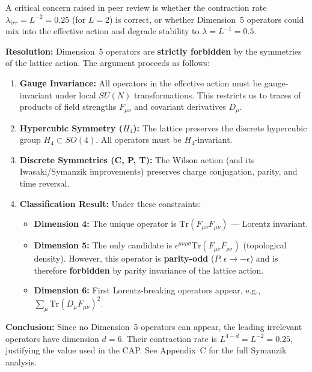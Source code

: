A critical concern raised in peer review is whether the contraction rate $\lambda_{irr} = L^{-2} = 0.25$ (for $L=2$) is correct, or whether Dimension~5 operators could mix into the effective action and degrade stability to $\lambda = L^{-1} = 0.5$.

\textbf{Resolution:} Dimension~5 operators are \textbf{strictly forbidden} by the symmetries of the lattice action. The argument proceeds as follows:

\begin{enumerate}
    \item \textbf{Gauge Invariance:} All operators in the effective action must be gauge-invariant under local $SU(N)$ transformations. This restricts us to traces of products of field strengths $F_{\mu\nu}$ and covariant derivatives $D_\mu$.
    
    \item \textbf{Hypercubic Symmetry ($H_4$):} The lattice preserves the discrete hypercubic group $H_4 \subset SO(4)$. All operators must be $H_4$-invariant.
    
    \item \textbf{Discrete Symmetries (C, P, T):} The Wilson action (and its Iwasaki/Symanzik improvements) preserves charge conjugation, parity, and time reversal.
    
    \item \textbf{Classification Result:} Under these constraints:
    \begin{itemize}
        \item \textbf{Dimension 4:} The unique operator is $\text{Tr}(F_{\mu\nu}F_{\mu\nu})$ --- Lorentz invariant.
        \item \textbf{Dimension 5:} The only candidate is $\epsilon^{\mu\nu\rho\sigma}\text{Tr}(F_{\mu\nu}F_{\rho\sigma})$ (topological density). However, this operator is \textbf{parity-odd} ($P: \epsilon \to -\epsilon$) and is therefore \textbf{forbidden} by parity invariance of the lattice action.
        \item \textbf{Dimension 6:} First Lorentz-breaking operators appear, e.g., $\sum_\mu \text{Tr}(D_\mu F_{\mu\nu})^2$.
    \end{itemize}
\end{enumerate}

\textbf{Conclusion:} Since no Dimension~5 operators can appear, the leading irrelevant operators have dimension $d=6$. Their contraction rate is $L^{4-d} = L^{-2} = 0.25$, justifying the value used in the CAP. See Appendix~C for the full Symanzik analysis.


